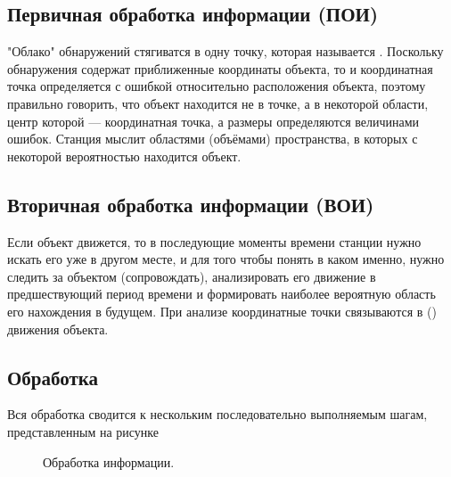 \subsection{Первичная обработка информации (ПОИ)}

"Облако"{} обнаружений стягиватся в одну точку, которая называется . Поскольку обнаружения содержат
приближенные координаты объекта, то и координатная точка определяется с ошибкой относительно расположения объекта, поэтому
правильно говорить, что объект находится не в точке, а в некоторой области, центр которой --- координатная точка, а размеры определяются
величинами ошибок. Станция мыслит областями (объёмами) пространства, в которых с некоторой вероятностью находится объект.

\subsection{Вторичная обработка информации (ВОИ)}

Если объект движется, то в последующие моменты времени станции нужно искать его уже в другом месте, и для того чтобы понять в каком
именно, нужно следить за объектом (сопровождать), анализировать его движение в предшествующий период времени и формировать наиболее
вероятную область его нахождения в будущем. При анализе координатные точки связываются в  () движения
объекта.

\subsection{Обработка}

Вся обработка сводится к нескольким последовательно выполняемым шагам, представленным на рисунке

\begin{figure}[!h]
    \centering
    \caption{Обработка информации.}
\end{figure}

